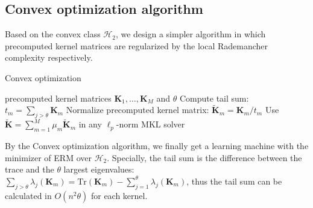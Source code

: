 \documentclass{article}
\begin{document}
\subsection{Convex optimization algorithm}
Based on the convex class $\mathcal{H}_2$, we design a simpler algorithm in which precomputed kernel matrices are regularized by the local Rademancher complexity respectively.
\begin{algorithm}[tb]
   \caption{Convex optimization}
   \label{algorithm1}
    \begin{algorithmic}
        precomputed kernel matrices $\mathbf{K}_1,\ldots,\mathbf{K}_M$ and $\theta$
        \STATE Compute tail sum: $t_m=\sum_{j>\theta}\mathbf{K}_m$
        \STATE Normalize precomputed kernel matrix: $\widetilde{\mathbf{K}}_m=\mathbf{K}_m/t_m$
       \ENDFOR
       \STATE Use $\widetilde{\mathbf{K}}=\sum_{m=1}^M \mu_m \widetilde{\mathbf{K}}_m$ in any $\ell_p$-norm MKL solver
    \end{algorithmic}
\end{algorithm}

By the Convex optimization algorithm, we finally get a learning machine with the minimizer of ERM over $\mathcal{H}_2$. Specially, the tail sum is the difference between the trace and the $\theta$ largest eigenvalues:$\sum_{j>\theta}\lambda_j(\mathbf{K}_m)=\mathrm{Tr}(\mathbf{K}_m)-\sum_{j=1}^\theta\lambda_j(\mathbf{K}_m)$, thus the tail sum can be calculated in $O(n^2\theta)$ for each kernel.
\end{document}
